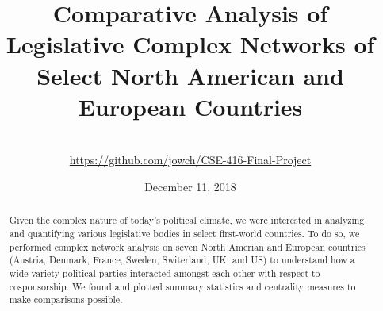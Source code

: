 \documentclass[12pt]{article}
\title{Comparative Analysis of Legislative Complex Networks of Select North American and European Countries}
\author{\names \\ \small\url{https://github.com/jowch/CSE-416-Final-Project}}
\date{December 11, 2018}
\begin{document}
\maketitle
\thispagestyle{empty}

\begin{abstract}
    Given the complex nature of today's political climate, we were interested in analyzing and quantifying various legislative bodies in select first-world countries. To do so, we performed complex network analysis on seven North Amerian and European countries (Austria, Denmark, France, Sweden, Switerland, UK, and US) to understand how a wide variety political parties interacted amongst each other with respect to cosponsorship. We found and plotted summary statistics and centrality measures to make comparisons possible.
\end{abstract}
\end{document}
